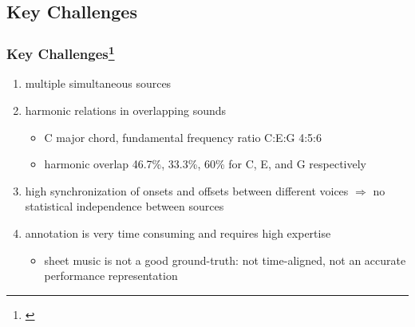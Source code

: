 \documentclass{beamer}
\begin{document}

\subsection{Key Challenges}
\begin{frame}
	\frametitle{Key Challenges\footnote{\cite{Overview}}}
	\begin{enumerate}
		\item multiple simultaneous sources
		\item harmonic relations in overlapping sounds
		      \begin{itemize}
			      \item C major chord, fundamental frequency ratio C:E:G 4:5:6
			      \item harmonic overlap 46.7\%, 33.3\%, 60\% for C, E, and G respectively
		      \end{itemize}
		\item high synchronization of onsets and offsets between different voices $\Rightarrow$ no statistical independence between sources
		\item annotation is very time consuming and requires high expertise
		      \begin{itemize}
			      \item sheet music is not a good ground-truth: not time-aligned, not an accurate performance representation
		      \end{itemize}
	\end{enumerate}

\end{frame}
\end{document}
